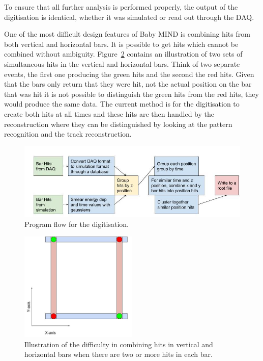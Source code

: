 To ensure that all further analysis is performed properly, the output of the digitisation is identical, whether it was simulated or read out through the DAQ.

One of the most difficult design features of Baby MIND is combining hits from both vertical and horizontal bars. It is possible to get hits which cannot be combined without ambiguity. Figure~\ref{fig:BarAmbi} contains an illustration of two sets of simultaneous hits in the vertical and horizontal bars. Think of two separate events, the first one producing the green hits and the second the red hits. Given that the bars only return that they were hit, not the actual position on the bar that was hit it is not possible to distinguish the green hits from the red hits, they would produce the same data. The current method is for the digitisation to create both hits at all times and these hits are then handled by the reconstruction where they can be distinguished by looking at the pattern recognition and the track reconstruction.

\begin{figure}[h!]
\centering
\includegraphics[width=\textwidth]{figures/Digitisation.jpg}
\caption{Program flow for the digitisation.}
\label{fig:digi}
\end{figure}

\begin{figure}[h!]
\centering
\includegraphics[width=0.5\textwidth]{figures/BarsAmbi.jpg}
\caption{Illustration of the difficulty in combining hits in vertical and horizontal bars when there are two or more hits in each bar.}
\label{fig:BarAmbi}
\end{figure}

